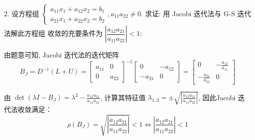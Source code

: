 \begin{tcolorbox}[breakable,
		colframe=white!10!jingga, coltitle=white!90!jingga, colback=white!95!jingga, coltext=black, colbacktitle=white!10!jingga, enhanced, fonttitle=\bfseries,fontupper=\normalsize, attach boxed title to top left={yshift=-2mm}, before skip=8pt, after skip=8pt,
		title=解答题]


2. 设方程组 $ \left\{\begin{array}{l}a_{11} x_{1}+a_{12} x_{2}=b_{1} \\ a_{21} x_{1}+a_{22} x_{2}=b_{2}\end{array}, a_{11} a_{22} \neq 0\right. $.
求证: 用 Jacobi 迭代法与 G-S 迭代法解此方程组
收敛的充要条件为 $\left|\dfrac{a_{12} a_{21}}{a_{11} a_{22}}\right|<1 ;$

\tcblower

由题意可知, Jacobi 迭代法的迭代矩阵
$$
B_{J}=D^{-1}(L+U)=\left[\begin{array}{cc}
a_{11} & 0 \\
0 & a_{22}
\end{array}\right]^{-1}\left[\begin{array}{cc}
0 & -a_{12} \\
-a_{21} & 0
\end{array}\right]=\left[\begin{array}{cc}
0 & -\frac{a_{12}}{a_{11}} \\
-\frac{a_{21}}{a_{22}} & 0
\end{array}\right]
$$

由 $ \operatorname{det}\left(\lambda I-B_{J}\right)=\lambda^{2}-\frac{a_{12} a_{21}}{a_{11} a_{21}} $, 计算其特征值 $ \lambda_{1,2}= \pm \sqrt{\left|\frac{a_{12} a_{21}}{a_{11} a_{22}}\right|} $, 因此Jacobi 迭代法收敛满足：
$$
\rho\left(B_{J}\right)=\sqrt{\left|\frac{a_{12} a_{21}}{a_{11} a_{22}}\right|}<1\iff \left|\dfrac{a_{12} a_{21}}{a_{11} a_{22}}\right|<1
$$


\end{tcolorbox}

